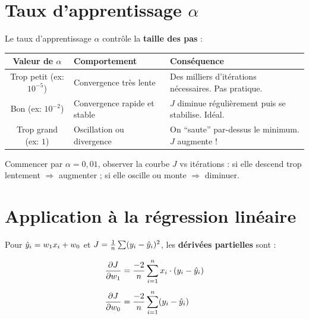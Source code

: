 \section{Taux d'apprentissage $\alpha$}

Le taux d'apprentissage $\alpha$ contr\^{o}le la \textbf{taille des pas} :

\begin{center}
\renewcommand{\arraystretch}{1.4}
\begin{tabularx}{\textwidth}{c >{\centering\arraybackslash}p{3.5cm} X}
    \toprule
    \textbf{Valeur de $\alpha$} & \textbf{Comportement} & \textbf{Cons\'{e}quence} \\
    \midrule
    Trop petit (ex: $10^{-5}$)
        & Convergence tr\`{e}s lente
        & Des milliers d'it\'{e}rations n\'{e}cessaires. Pas pratique. \\
    Bon (ex: $10^{-2}$)
        & Convergence rapide et stable
        & $J$ diminue r\'{e}guli\`{e}rement puis se stabilise. Id\'{e}al. \\
    Trop grand (ex: $1$)
        & Oscillation ou divergence
        & On ``saute'' par-dessus le minimum. $J$ augmente ! \\
    \bottomrule
\end{tabularx}
\end{center}

\begin{attentionbox}
    Commencer par $\alpha = 0{,}01$, observer la courbe $J$ vs it\'{e}rations :
    si elle descend trop lentement $\Rightarrow$ augmenter ;
    si elle oscille ou monte $\Rightarrow$ diminuer.
\end{attentionbox}

\section{Application \`{a} la r\'{e}gression lin\'{e}aire}

Pour $\hat{y}_i = w_1 x_i + w_0$ et $J = \frac{1}{n}\sum(y_i - \hat{y}_i)^2$,
les \textbf{d\'{e}riv\'{e}es partielles} sont :

\begin{align}
    \frac{\partial J}{\partial w_1}
    &= \frac{-2}{n} \sum_{i=1}^{n} x_i \cdot (y_i - \hat{y}_i)
    \label{eq:dw1} \\[4pt]
    \frac{\partial J}{\partial w_0}
    &= \frac{-2}{n} \sum_{i=1}^{n} (y_i - \hat{y}_i)
    \label{eq:dw0}
\end{align}


